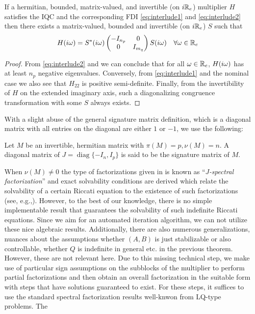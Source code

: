 \begin{thm}\label{thm:IQCinertia} If a hermitian, bounded, matrix-valued, and invertible (on $i\mathbb{R}_e$) multiplier $H$ satisfies the 
IQC and the corresponding FDI \eqref{eq:interlude1} and \eqref{eq:interlude2} then there exists a matrix-valued, bounded and 
invertible (on $i\mathbb{R}_e$) $S$ such that 
\[
H(i\omega) = S^*(i\omega)\begin{pmatrix}-I_{n_p}&0\\0&I_{m_q}\end{pmatrix}S(i\omega) \quad \forall\omega\in\mathbb{R}_e
\]
\end{thm}
\begin{proof} From \eqref{eq:interlude2} and  we can conclude that
for all $\omega\in\mathbb{R}_e$, $H(i\omega)$ has at least $n_p$ negative eigenvalues. Conversely, from
\eqref{eq:interlude1} and the nominal case we also see that $H_{22}$ is positive semi-definite. 
Finally, from the invertibility of $H$ on the extended imaginary axis, such a diagonalizing 
congruence transformation with some $S$ always exists. 
\end{proof}
With a slight abuse of the general signature matrix definition, which is a diagonal matrix with all entries on 
the diagonal are either $1$ or $-1$, we use the following: 
\begin{define} Let $M$ be an invertible, hermitian matrix with $\pi(M) = p,\nu(M)=n$. A diagonal matrix of 
$J= \operatorname{diag}\{-I_n,I_p\}$ is said to be the signature matrix of $M$. 
\end{define}
When $\nu(M)\neq 0$ the type of factorizations given in  is known as \enquote{\emph{$J$-spectral 
factorization}} and exact solvability conditions are derived which relate the solvability of a certain Riccati equation to the 
existence of such factorizations (see, e.g.,\cite{ranautomatica}). However, to the best of our knowledge, there is no simple implementable result 
that guarantees the solvability of such indefinite Riccati equations. Since we aim for an automated iteration 
algorithm, we can not utilize these nice algebraic results. Additionally, there are also numerous generalizations, 
nuances about the assumptions whether $(A,B)$ is just stabilizable or also controllable, whether $Q$ is indefinite 
in general etc. in the previous theorem. However, these are not relevant here. Due to this missing technical step, 
we make use of particular sign assumptions on the subblocks of the multiplier to perform partial factorizations and 
then obtain an overall factorization in the suitable form with steps that have solutions guaranteed to exist. For 
these steps, it suffices to use the standard spectral factorization results well-knwon from LQ-type problems. The 
